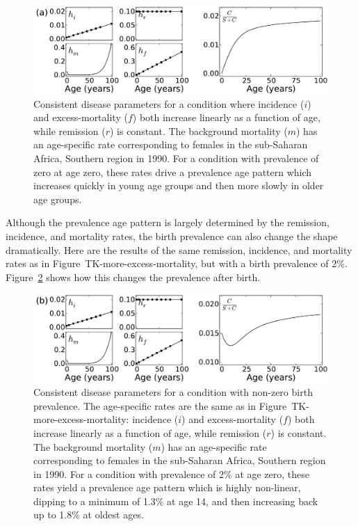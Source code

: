 \begin{figure}[h]
\begin{center}
\includegraphics[width=\textwidth]{more-excess-mortality.pdf}

\caption{Consistent disease parameters for a condition where incidence ($i$) and excess-mortality ($f$) both increase linearly as a function of age, while remission ($r$) is constant. The background mortality ($m$) has an age-specific rate corresponding to females in the sub-Saharan Africa, Southern region in 1990. For a condition with prevalence of zero at age zero, these rates drive a prevalence age pattern which increases quickly in young age groups and then more slowly in older age groups.}
\label{forward-sim-more-excess-mortality}
\end{center}
\end{figure}


Although the prevalence age pattern is largely determined by the remission, incidence, and mortality rates, the birth prevalence can also change the shape dramatically.  Here are the results of the same remission, incidence, and mortality rates as in Figure~TK-more-excess-mortality, but with a birth prevalence of 2\%.  Figure~\ref{forward-sim-birth-prevalence} shows how this changes the prevalence after birth.

\begin{figure}[h]
\begin{center}

\includegraphics[width=\textwidth]{birth-prevalence.pdf}

\caption{Consistent disease parameters for a condition with non-zero birth prevalence.  The age-specific rates are the same as in Figure~TK-more-excess-mortality: incidence ($i$) and excess-mortality ($f$) both increase linearly as a function of age, while remission ($r$) is constant. The background mortality ($m$) has an age-specific rate corresponding to females in the sub-Saharan Africa, Southern region in 1990. For a condition with prevalence of 2\% at age zero, these rates yield a prevalence age pattern which is highly non-linear, dipping to a minimum of 1.3\% at age 14, and then increasing back up to 1.8\% at oldest ages.}
\label{forward-sim-birth-prevalence}
\end{center}
\end{figure}


